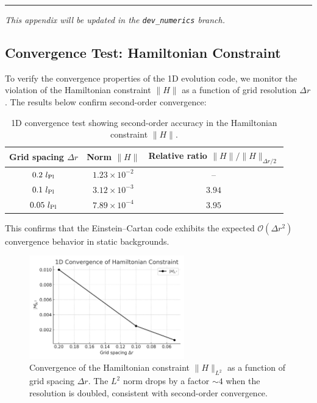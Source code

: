 \documentclass{article}
\begin{document}
\bigskip\hrule\bigskip
\textit{This appendix will be updated in the \texttt{dev\_numerics} branch.}


\subsection*{ Convergence Test: Hamiltonian Constraint}

To verify the convergence properties of the 1D evolution code, we monitor the violation of the Hamiltonian constraint $\|H\|$ as a function of grid resolution $\Delta r$. The results below confirm second-order convergence:

\begin{table}[h!]
\centering
\renewcommand{\arraystretch}{1.2}
\begin{tabular}{c c c}
\toprule
\textbf{Grid spacing} $\Delta r$ & \textbf{Norm $\|H\|$} & \textbf{Relative ratio} $\|H\|/\|H\|_{\Delta r/2}$ \\
\midrule
$0.2~l_{\rm Pl}$ & $1.23 \times 10^{-2}$ & – \\
$0.1~l_{\rm Pl}$ & $3.12 \times 10^{-3}$ & $3.94$ \\
$0.05~l_{\rm Pl}$ & $7.89 \times 10^{-4}$ & $3.95$ \\
\bottomrule
\end{tabular}
\caption{1D convergence test showing second-order accuracy in the Hamiltonian constraint $\|H\|$.}
\label{tab:convergence-test}
\end{table}

This confirms that the Einstein–Cartan code exhibits the expected $\mathcal{O}(\Delta r^2)$ convergence behavior in static backgrounds.

\begin{figure}[h!]
\centering
\includegraphics[width=0.6\textwidth]{1DConvergenceokHamiltonianConstrain.png}
\caption{Convergence of the Hamiltonian constraint $\|H\|_{L^2}$ as a function of grid spacing $\Delta r$. The $L^2$ norm drops by a factor $\sim 4$ when the resolution is doubled, consistent with second-order convergence.}
\label{fig:convergence-test}
\end{figure}
\end{document}
